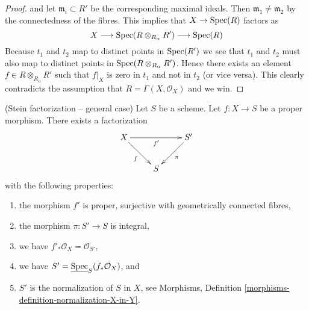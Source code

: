 \begin{proof}
and let $\mathfrak m_i \subset R'$ be the corresponding maximal
ideals. Then $\mathfrak m_1 \not = \mathfrak m_2$ by the connectedness
of the fibres. This implies that $X \to \mathop{\rm Spec}(R)$ factors as
$$
X \longrightarrow
\mathop{\rm Spec}(R \otimes_{R_\alpha} R') \longrightarrow
\mathop{\rm Spec}(R)
$$
Because $t_1$ and $t_2$ map to distinct points in $\mathop{\rm Spec}(R')$
we see that $t_1$ and $t_2$ must also map to distinct points in
$\mathop{\rm Spec}(R \otimes_{R_\alpha} R')$. Hence there exists an
element $f \in R \otimes_{R_\alpha} R'$ such that
$f|_X$ is zero in $t_1$ and not in $t_2$ (or vice versa).
This clearly contradicts
the assumption that $R = \Gamma(X, \mathcal{O}_X)$ and we win.
\end{proof}

\begin{theorem}
\label{theorem-stein-factorization-general}
(Stein factorization -- general case)
Let $S$ be a scheme.
Let $f : X \to S$ be a proper morphism.
There exists a factorization
$$
\xymatrix{
X \ar[rr]_{f'} \ar[rd]_f & & S' \ar[dl]^\pi \\
& S &
}
$$
with the following properties:
\begin{enumerate}
\item the morphism $f'$ is proper, surjective
with geometrically connected fibres,
\item the morphism $\pi : S' \to S$ is integral,
\item we have $f'_*\mathcal{O}_X = \mathcal{O}_{S'}$,
\item we have $S' = \underline{\mathop{\rm Spec}}_S(f_*\mathcal{O}_X)$, and
\item $S'$ is the normalization of $S$ in $X$, see
Morphisms, Definition \ref{morphisms-definition-normalization-X-in-Y}.
\end{enumerate}
\end{theorem}

